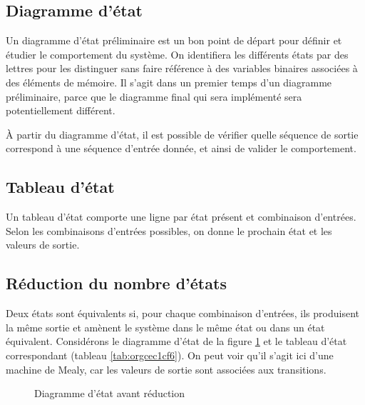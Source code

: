 \documentclass[11pt]{article}
\begin{document}
\subsection{Diagramme d'état}
\label{sec:org4e85c8a}

Un diagramme d'état préliminaire est un bon point de départ pour
définir et étudier le comportement du système. On identifiera les
différents états par des lettres pour les distinguer sans faire
référence à des variables binaires associées à des éléments de
mémoire. Il s'agit dans un premier temps d'un diagramme préliminaire,
parce que le diagramme final qui sera implémenté sera potentiellement
différent.

À partir du diagramme d'état, il est possible de vérifier quelle
séquence de sortie correspond à une séquence d'entrée donnée, et ainsi
de valider le comportement.

\subsection{Tableau d'état}
\label{sec:orgc7a177c}

Un tableau d'état comporte une ligne par état présent et combinaison
d'entrées. Selon les combinaisons d'entrées possibles, on donne le
prochain état et les valeurs de sortie.

\subsection{Réduction du nombre d'états}
\label{sec:org86e81e5}

Deux états sont équivalents si, pour chaque combinaison d'entrées, ils
produisent la même sortie et amènent le système dans le même état ou
dans un état équivalent. Considérons le diagramme d'état de la figure
\ref{fig:org8364c64} et le tableau d'état correspondant (tableau 
\ref{tab:orgcec1cf6}). On peut voir qu'il s'agit ici d'une machine de
Mealy, car les valeurs de sortie sont associées aux transitions.


\begin{figure}[htbp]
\centering

\caption{\label{fig:org8364c64}Diagramme d'état avant réduction}
\end{figure}
\end{document}
